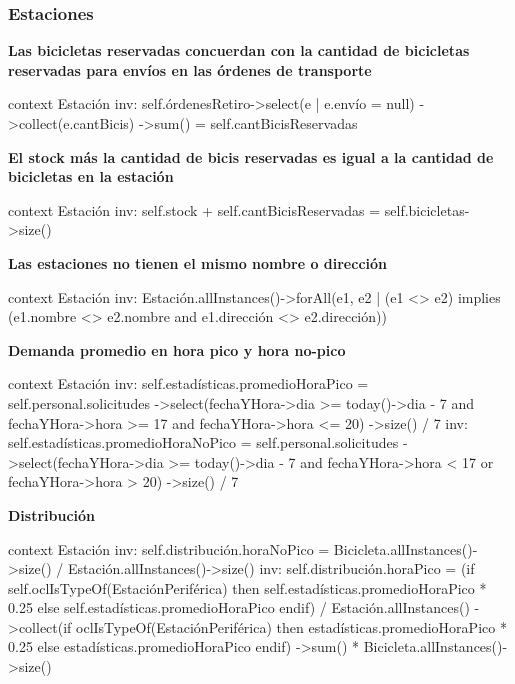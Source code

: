 \documentclass[a4paper, 10pt, twoside]{article}
\newenvironment{ocl}[1]
  {
    \textbf{#1}
    \verbatim
  }{
    \endverbatim
  }
\begin{document}
\subsubsection{Estaciones}

\begin{ocl}{Las bicicletas reservadas concuerdan con la cantidad de bicicletas reservadas para envíos en las órdenes de transporte}
  context Estación
  inv: self.órdenesRetiro->select(e | e.envío = null)
                         ->collect(e.cantBicis)
                         ->sum() = self.cantBicisReservadas
\end{ocl}

\begin{ocl}{El stock más la cantidad de bicis reservadas es igual a la cantidad de bicicletas en la estación}
  context Estación
  inv: self.stock + self.cantBicisReservadas = self.bicicletas->size()
\end{ocl}

\begin{ocl}{Las estaciones no tienen el mismo nombre o dirección}
  context Estación
  inv: Estación.allInstances()->forAll(e1, e2 |
           (e1 <> e2) implies (e1.nombre <> e2.nombre and e1.dirección <> e2.dirección))
\end{ocl}

\begin{ocl}{Demanda promedio en hora pico y hora no-pico}
  context Estación
  inv: self.estadísticas.promedioHoraPico = 
       self.personal.solicitudes
           ->select(fechaYHora->dia >= today()->dia - 7 and
                    fechaYHora->hora >= 17 and
                    fechaYHora->hora <= 20)
           ->size() / 7
  inv: self.estadísticas.promedioHoraNoPico = 
       self.personal.solicitudes
           ->select(fechaYHora->dia >= today()->dia - 7 and
                    fechaYHora->hora < 17 or
                    fechaYHora->hora > 20)
           ->size() / 7
\end{ocl}

\begin{ocl}{Distribución}
  context Estación
  inv: self.distribución.horaNoPico =
           Bicicleta.allInstances()->size() /
           Estación.allInstances()->size()
  inv: self.distribución.horaPico =
           (if self.oclIsTypeOf(EstaciónPeriférica) then
               self.estadísticas.promedioHoraPico * 0.25
           else
               self.estadísticas.promedioHoraPico
           endif) /
           Estación.allInstances()
               ->collect(if oclIsTypeOf(EstaciónPeriférica) then
                             estadísticas.promedioHoraPico * 0.25
                         else
                             estadísticas.promedioHoraPico
                         endif)
               ->sum() *
           Bicicleta.allInstances()->size()
\end{ocl}
\end{document}
